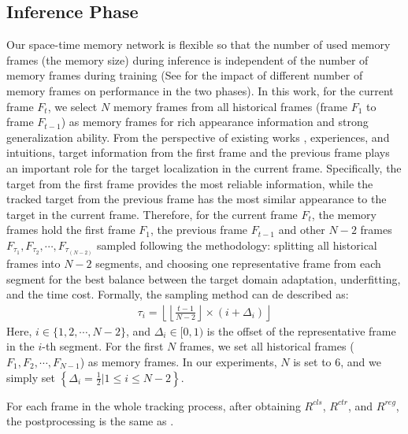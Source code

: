 \documentclass[final]{cvpr}
\begin{document}
\subsection{Inference Phase}\label{subsec:inference-phase}
Our space-time memory network is flexible so that the number of used memory frames (\ie the memory size) during inference is independent of the number of memory frames during training (See  for the impact of different number of memory frames on performance in the two phases).
In this work, for the current frame $F_{t}$, we select $N$ memory frames from all historical frames (\ie frame $F_{1}$ to frame $F_{t-1}$) as memory frames for rich appearance information and strong generalization ability.
From the perspective of existing works \cite{voigtlaender2020siam,oh2019video}, experiences, and intuitions, target information from the first frame and the previous frame plays an important role for the target localization in the current frame.
Specifically, the target from the first frame provides the most reliable information, while the tracked target from the previous frame has the most similar appearance to the target in the current frame.
Therefore, for the current frame $F_{t}$, the memory frames hold the first frame $F_1$, the previous frame $F_{t-1}$ and other $N-2$ frames $F_{\tau_1},F_{\tau_2},\cdots,F_{\tau_{\left({N-2}\right)}}$ sampled following the methodology: splitting all historical frames into $N-2$ segments, and choosing one representative frame from each segment for the best balance between the target domain adaptation, underfitting, and the time cost.
Formally, the sampling method can de described as:
\begin{equation}\label{eq:inference-sampling}
\begin{split}
\tau_{i}=\left\lfloor \left\lfloor \frac{t-1}{N-2} \right\rfloor \times \left(i + \Delta_{i}\right) \right\rfloor
\end{split}
\end{equation}
Here, $i \in \{1,2,\cdots,N-2\}$, and $\Delta_{i} \in [0, 1)$ is the offset of the representative frame in the $i$-th segment.
For the first $N$ frames, we set all historical frames (\ie $F_{1},F_{2},\cdots,F_{N-1}$) as memory frames.
In our experiments, $N$ is set to $6$, and we simply set $\left\{\Delta_{i}=\frac{1}{2} | 1 \le i \le N-2 \right\}$.

For each frame in the whole tracking process, after obtaining $R^{cls}$, $R^{ctr}$, and $R^{reg}$, the postprocessing is the same as \cite{xu2020siamfc++}.
\end{document}
